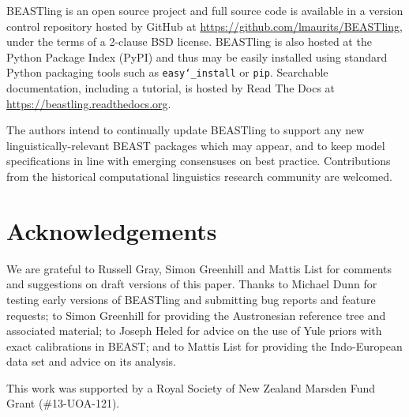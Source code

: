 \documentclass[10pt,a4paper]{article}
\begin{document}
BEASTling is an open source project and full source code is available in a version control repository hosted by GitHub at \url{https://github.com/lmaurits/BEASTling}, under the terms of a 2-clause BSD license.  BEASTling is also hosted at the Python Package Index (PyPI) and thus may be easily installed using standard Python packaging tools such as \texttt{easy\char`_install} or \texttt{pip}.  Searchable documentation, including a tutorial, is hosted by Read The Docs at \url{https://beastling.readthedocs.org}.

The authors intend to continually update BEASTling to support any new linguistically-relevant BEAST packages which may appear, and to keep model specifications in line with emerging consensuses on best practice.  Contributions from the historical computational linguistics research community are welcomed.

\section{Acknowledgements}

We are grateful to Russell Gray, Simon Greenhill and Mattis List for comments and suggestions on draft versions of this paper.  Thanks to Michael Dunn for testing early versions of BEASTling and submitting bug reports and feature requests; to Simon Greenhill for providing the Austronesian reference tree and associated material; to Joseph Heled for advice on the use of Yule priors with exact calibrations in BEAST; and to Mattis List for providing the Indo-European data set and advice on its analysis.

This work was supported by a Royal Society of New Zealand Marsden Fund Grant (\#13-UOA-121).



\end{document}
